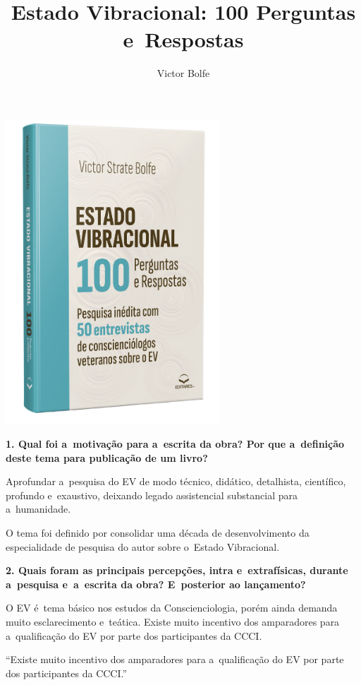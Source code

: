 \documentclass{gescons}
\author{Victor Bolfe}
\title{Estado Vibracional: 100 Perguntas e~Respostas}
\begin{document}
    \makeentrevistatitle

    \begin{multicols}{2}


\begin{center}
    \includegraphics[width=8cm]{articles/entrevista/mockups/Victor-Bolfe}
\end{center}

\textbf{1. Qual foi a~motivação para a~escrita da obra? Por que a~definição deste tema para publicação de um livro?}

Aprofundar a~pesquisa do EV de modo técnico, didático, detalhista, científico, profundo e~exaustivo, deixando legado assistencial substancial para a~humanidade. 

O tema foi definido por consolidar uma década de desenvolvimento da especialidade de pesquisa do autor sobre o~Estado Vibracional. 

\textbf{2. Quais foram as principais percepções, intra e~extrafísicas, durante a~pesquisa e~a~escrita da obra? E~posterior ao lançamento?}

O EV é~tema básico nos estudos da Conscienciologia, porém ainda demanda muito esclarecimento e~teática. Existe muito incentivo dos amparadores para a~qualificação do EV por parte dos participantes da CCCI. 

\begin{pullquote}
    ``Existe muito incentivo dos amparadores para a~qualificação do EV por parte dos participantes da CCCI.''
\end{pullquote}



\end{multicols}
\end{document}
